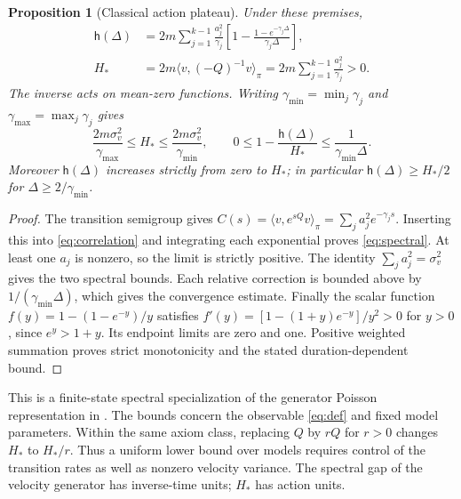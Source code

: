 \documentclass[11pt,a4paper]{article}
\newtheorem{proposition}{Proposition}
\newcommand{\ha}{\mathsf h}
\begin{document}
\begin{proposition}[Classical action plateau]\label{prop:plateau}
Under these premises,
\begin{align}
 \ha(\Delta)&=2m\sum_{j=1}^{k-1}\frac{a_j^2}{\gamma_j}
 \left[1-\frac{1-e^{-\gamma_j\Delta}}{\gamma_j\Delta}\right],
 \label{eq:spectral}\\
 H_*&=2m\langle v,(-Q)^{-1}v\rangle_\pi
 =2m\sum_{j=1}^{k-1}\frac{a_j^2}{\gamma_j}>0.\label{eq:plateau}
\end{align}
The inverse acts on mean-zero functions. Writing
$\gamma_{\min}=\min_j\gamma_j$ and $\gamma_{\max}=\max_j\gamma_j$ gives
\begin{equation}\label{eq:bounds}
 \frac{2m\sigma_v^2}{\gamma_{\max}}\le H_*
 \le\frac{2m\sigma_v^2}{\gamma_{\min}},\qquad
 0\le1-\frac{\ha(\Delta)}{H_*}\le\frac{1}{\gamma_{\min}\Delta}.
\end{equation}
Moreover $\ha(\Delta)$ increases strictly from zero to $H_*$; in particular
$\ha(\Delta)\ge H_*/2$ for $\Delta\ge2/\gamma_{\min}$.
\end{proposition}
\begin{proof}
The transition semigroup gives
$C(s)=\langle v,e^{sQ}v\rangle_\pi=\sum_j a_j^2e^{-\gamma_js}$.
Inserting this into \eqref{eq:correlation} and integrating each exponential
proves \eqref{eq:spectral}. At least one $a_j$ is nonzero, so the limit is
strictly positive. The identity $\sum_j a_j^2=\sigma_v^2$ gives the two
spectral bounds. Each relative correction is bounded above by
$1/(\gamma_{\min}\Delta)$, which gives the convergence estimate.
Finally the scalar function $f(y)=1-(1-e^{-y})/y$ satisfies
$f'(y)=[1-(1+y)e^{-y}]/y^2>0$ for $y>0$, since $e^y>1+y$.
Its endpoint limits are zero and one. Positive weighted summation proves
strict monotonicity and the stated duration-dependent bound.
\end{proof}

This is a finite-state spectral specialization of the generator Poisson
representation in \cite[\S2]{Pavliotis2010}. The bounds concern the observable
\eqref{eq:def} and fixed model parameters. Within the same axiom class,
replacing $Q$ by $rQ$ for $r>0$ changes $H_*$ to $H_*/r$. Thus a uniform
lower bound over models requires control of the transition rates as well as
nonzero velocity variance. The spectral gap of the velocity generator has
inverse-time units; $H_*$ has action units.
\end{document}
